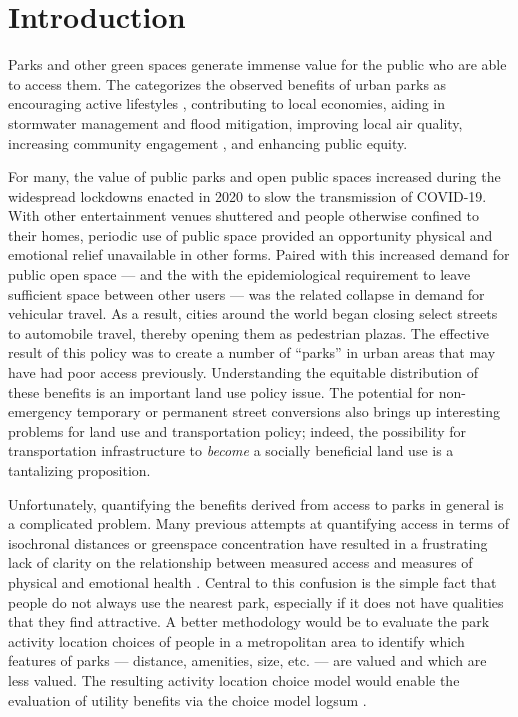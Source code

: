 \documentclass[3p, authoryear, review]{elsarticle} %
\begin{document}
\hypertarget{intro}{%
\section{Introduction}\label{intro}}

Parks and other green spaces generate immense value for the public who are able
to access them. The \citet{CityParksAlliance} categorizes the observed benefits of
urban parks as encouraging active lifestyles \citep{Bancroft2015}, contributing to
local economies, aiding in stormwater management and flood mitigation,
improving local air quality, increasing community engagement \citep{Madzia2018}, and
enhancing public equity.

For many, the value of public parks and open public spaces increased during the
widespread lockdowns enacted in 2020 to slow the transmission of COVID-19. With
other entertainment venues shuttered and people otherwise confined to their
homes, periodic use of public space provided an opportunity physical and emotional relief
unavailable in other forms. Paired with this increased demand for public open
space --- and the with the epidemiological requirement to leave sufficient space
between other users --- was the related collapse in demand for vehicular travel.
As a result, cities around the world began closing select streets to automobile
travel, thereby opening them as pedestrian plazas. The effective result of this
policy was to create a number of ``parks'' in urban areas that may have had
poor access previously. Understanding the equitable distribution of these
benefits is an important land use policy issue. The potential for non-emergency
temporary or permanent street conversions also brings up interesting problems
for land use and transportation policy; indeed, the possibility for
transportation infrastructure to \emph{become} a socially beneficial land use is
a tantalizing proposition.

Unfortunately, quantifying the benefits derived from access to parks in general
is a complicated problem. Many previous attempts at quantifying access in terms
of isochronal distances or greenspace concentration have resulted in a
frustrating lack of clarity on the relationship between measured access and
measures of physical and emotional health \citep{Bancroft2015}. Central to this
confusion is the simple fact that people do not always use the nearest park,
especially if it does not have qualities that they find attractive. A better
methodology would be to evaluate the park activity location choices of people in
a metropolitan area to identify which features of parks --- distance, amenities,
size, etc. --- are valued and which are less valued. The resulting activity
location choice model would enable the evaluation of utility benefits via the
choice model logsum \citep{Handy1997, DeJong2007}.
\end{document}
